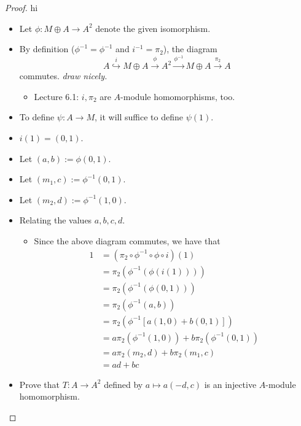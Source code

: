 \documentclass[../psets.tex]{subfiles}
\begin{document}
\begin{enumerate}
\begin{proof}
        {\color{white}hi}
        \begin{itemize}
            \item Let $\phi:M\oplus A\to A^2$ denote the given isomorphism.
            \item By definition ($\phi^{-1}=\phi^{-1}$ and $i^{-1}=\pi_2$), the diagram
            \begin{equation*}
                A \stackrel{i}{\hookrightarrow} M\oplus A
                \xrightarrow{\phi} A^2
                \xrightarrow{\phi^{-1}} M\oplus A
                \xrightarrow{\pi_2} A
            \end{equation*}
            commutes. \emph{draw nicely.}
            \begin{itemize}
                \item Lecture 6.1: $i,\pi_2$ are $A$-module homomorphisms, too.
            \end{itemize}
            \item To define $\psi:A\to M$, it will suffice to define $\psi(1)$.
            \item $i(1)=(0,1)$.
            \item Let $(a,b):=\phi(0,1)$.
            \item Let $(m_1,c):=\phi^{-1}(0,1)$.
            \item Let $(m_2,d):=\phi^{-1}(1,0)$.
            \item Relating the values $a,b,c,d$.
            \begin{itemize}
                \item Since the above diagram commutes, we have that
                \begin{align*}
                    1 &= (\pi_2\circ\phi^{-1}\circ\phi\circ i)(1)\\
                    &= \pi_2(\phi^{-1}(\phi(i(1))))\\
                    &= \pi_2(\phi^{-1}(\phi(0,1)))\\
                    &= \pi_2(\phi^{-1}(a,b))\\
                    &= \pi_2(\phi^{-1}[a(1,0)+b(0,1)])\\
                    &= a\pi_2(\phi^{-1}(1,0))+b\pi_2(\phi^{-1}(0,1))\\
                    &= a\pi_2(m_2,d)+b\pi_2(m_1,c)\\
                    &= ad+bc
                \end{align*}
            \end{itemize}
            \item Prove that $T:A\to A^2$ defined by $a\mapsto a(-d,c)$ is an injective $A$-module homomorphism.

\end{itemize}
\end{proof}
\end{enumerate}
\end{document}
